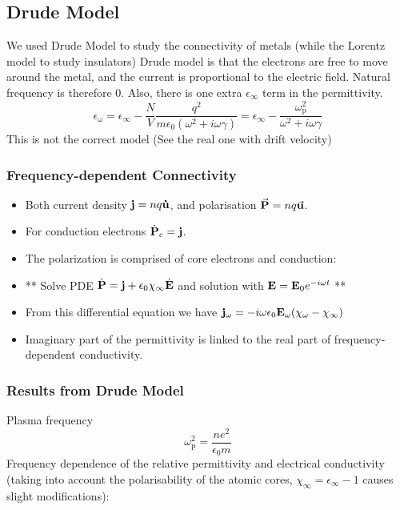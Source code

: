 \documentclass[12pt,a4paper]{article}
\begin{document}
\subsection{Drude Model}
    We used Drude Model to study the connectivity of metals (while the Lorentz model to study insulators)
    Drude model is that the electrons are free to move around the metal, and the current is proportional to the electric field. Natural frequency is therefore 0. Also, there is one extra $\epsilon_\infty$ term in the permittivity.
    $$
    \epsilon_\omega=\epsilon_{\infty}-\frac{N}{V} \frac{q^2}{m \epsilon_0\left(\omega^2+i \omega \gamma\right)}=\epsilon_{\infty}-\frac{\omega_{\mathrm{p}}^2}{\omega^2+i \omega \gamma}
    $$
    This is not the correct model (See the real one with drift velocity)
    \subsubsection{Frequency-dependent Connectivity}
        \begin{itemize}
            \item Both current density $\vb{j}= nq\vb{\dot{u}}$, and polarisation $\va{P}=nq\va{u}$.
            \item For conduction electrons $\dot{\vb{P}}_c = \vb{j}$.
            \item The polarization is comprised of core electrons and conduction:
            \item ** Solve PDE $\dot{\vb{P}} = \vb{j} + \epsilon_0 \chi_\infty \dot{\vb{E}}$ and solution with $\vb{E} = \vb{E}_0 e^{-i\omega t}$ **
            \item From this differential equation we have $\vb{j}_\omega = -i\omega \epsilon_0 \vb{E}_\omega (\chi_\omega-\chi_\infty)$
            \item Imaginary part of the permittivity is linked to the real part of frequency-dependent conductivity.
        \end{itemize}

    \subsubsection{ Results from Drude Model}
    Plasma frequency
    $$
    \omega_{\mathrm{p}}^2=\frac{n e^2}{\epsilon_0 m}
    $$
    Frequency dependence of the relative permittivity and electrical conductivity (taking into account the polarisability of the atomic cores, $\chi_{\infty}=\epsilon_{\infty}-1$ causes slight modifications):
\end{document}
